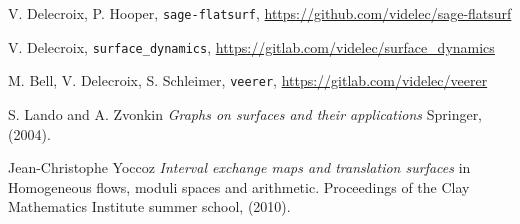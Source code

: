 \documentclass{article}
\begin{document}
%
%
%
%

\begin{thebibliography}{sage-flatsurf}

V. Delecroix, P. Hooper,
\texttt{sage-flatsurf},
\url{https://github.com/videlec/sage-flatsurf}

V. Delecroix,
\texttt{surface\_dynamics},
\url{https://gitlab.com/videlec/surface_dynamics}

M. Bell, V. Delecroix, S. Schleimer,
\texttt{veerer},
\url{https://gitlab.com/videlec/veerer}

S. Lando and A. Zvonkin
\textit{Graphs on surfaces and their applications}
Springer, (2004).

Jean-Christophe Yoccoz
\textit{Interval exchange maps and translation surfaces}
in Homogeneous flows, moduli spaces and arithmetic.
Proceedings of the Clay Mathematics Institute summer school,
(2010).
\end{thebibliography}
\end{document}
